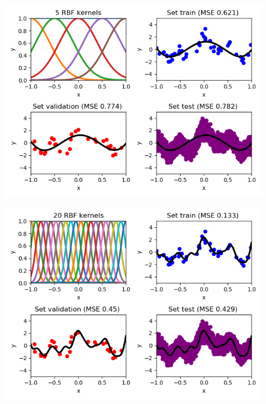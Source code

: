 \documentclass[a4paper]{article}
\begin{document}
\begin{itemize}
\begin{minipage}[b]{0.4\textwidth}
  \includegraphics[scale=0.35]{plots/plot_rbf_degree5.png}
 \captionsetup{justification=centering} 
  \label{plot_rbf_degree5}
\end{minipage}
\hfill
\begin{minipage}[b]{0.4\textwidth}
  \includegraphics[scale=0.35]{plots/plot_rbf_degree20.png}
 \captionsetup{justification=centering}
  \label{plot_rbf_degree20}
\end{minipage}

\newpage


\end{itemize}
\end{document}
